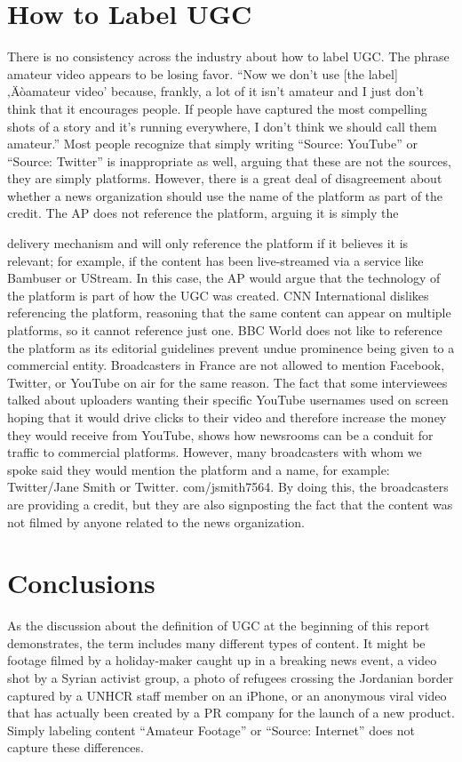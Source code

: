\documentclass[symmetric, notoc, nobib]{towcenter-book}
\begin{document}
\section{How to Label UGC}
There is no consistency across the industry about how to label UGC. The
phrase amateur video appears to be losing favor. ``Now we don't use [the
label] ‚Äòamateur video' because, frankly, a lot of it isn't amateur and I just
don't think that it encourages people. If people have captured the most
compelling shots of a story and it's running everywhere, I don't think we
should call them amateur.''
Most people recognize that simply writing ``Source: YouTube'' or ``Source:
Twitter'' is inappropriate as well, arguing that these are not the sources, they
are simply platforms. However, there is a great deal of disagreement about
whether a news organization should use the name of the platform as part of
the credit. The AP does not reference the platform, arguing it is simply the

delivery mechanism and will only reference the platform if it believes it is
relevant; for example, if the content has been live-streamed via a service like
Bambuser or UStream. In this case, the AP would argue that the technology
of the platform is part of how the UGC was created.
CNN International dislikes referencing the platform, reasoning that the
same content can appear on multiple platforms, so it cannot reference
just one. BBC World does not like to reference the platform as its editorial
guidelines prevent undue prominence being given to a commercial entity.
Broadcasters in France are not allowed to mention Facebook, Twitter, or
YouTube on air for the same reason. The fact that some interviewees talked
about uploaders wanting their specific YouTube usernames used on screen
hoping that it would drive clicks to their video and therefore increase the
money they would receive from YouTube, shows how newsrooms can be a
conduit for traffic to commercial platforms.
However, many broadcasters with whom we spoke said they would mention
the platform and a name, for example: Twitter/Jane Smith or Twitter.
com/jsmith7564. By doing this, the broadcasters are providing a credit, but
they are also signposting the fact that the content was not filmed by anyone
related to the news organization.
\section{Conclusions}
As the discussion about the definition of UGC at the beginning of this
report demonstrates, the term includes many different types of content. It
might be footage filmed by a holiday-maker caught up in a breaking news
event, a video shot by a Syrian activist group, a photo of refugees crossing
the Jordanian border captured by a UNHCR staff member on an iPhone, or
an anonymous viral video that has actually been created by a PR company
for the launch of a new product. Simply labeling content ``Amateur Footage''
or ``Source: Internet'' does not capture these differences.
\end{document}
